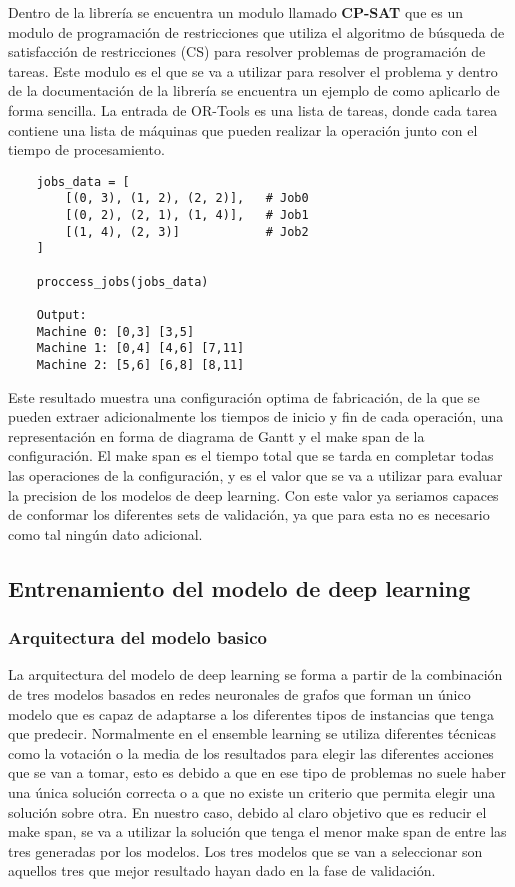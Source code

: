 Dentro de la librería se encuentra un modulo llamado \textbf{CP-SAT} que es un modulo de programación
de restricciones que utiliza el algoritmo de búsqueda de satisfacción de restricciones (CS) para resolver
problemas de programación de tareas. Este modulo es el que se va a utilizar para resolver el problema y
dentro de la documentación \cite{ortools-jobshop} de la librería se encuentra un ejemplo de como 
aplicarlo de forma sencilla. La entrada de OR-Tools es una lista de tareas, donde cada tarea contiene
una lista de máquinas que pueden realizar la operación junto con el tiempo de procesamiento.\medskip

\begin{lstlisting}
    jobs_data = [                   
        [(0, 3), (1, 2), (2, 2)],   # Job0
        [(0, 2), (2, 1), (1, 4)],   # Job1
        [(1, 4), (2, 3)]            # Job2
    ]
   
    proccess_jobs(jobs_data)

    Output:
    Machine 0: [0,3] [3,5]
    Machine 1: [0,4] [4,6] [7,11]
    Machine 2: [5,6] [6,8] [8,11]
\end{lstlisting}

Este resultado muestra una configuración optima de fabricación, de la que se pueden extraer
adicionalmente los tiempos de inicio y fin de cada operación, una representación en forma de
diagrama de Gantt y el make span de la configuración. El make span es el tiempo total que se 
tarda en completar todas las operaciones de la configuración, y es el valor que se va a utilizar
para evaluar la precision de los modelos de deep learning. Con este valor ya seriamos capaces
de conformar los diferentes sets de validación, ya que para esta no es necesario como tal ningún
dato adicional. 

\subsection{Entrenamiento del modelo de deep learning}
\subsubsection{Arquitectura del modelo basico}
La arquitectura del modelo de deep learning se forma a partir de la combinación de tres 
modelos basados en redes neuronales de grafos que forman un único modelo que es capaz 
de adaptarse a los diferentes tipos de instancias que tenga que predecir. Normalmente en el
ensemble learning se utiliza diferentes técnicas como la votación o la media de los resultados
para elegir las diferentes acciones que se van a tomar, esto es debido a que en ese tipo de problemas
no suele haber una única solución correcta o a que no existe un criterio que permita 
elegir una solución sobre otra. En nuestro caso, debido al claro objetivo que es reducir 
el make span, se va a utilizar la solución que tenga el menor make span de entre las tres 
generadas por los modelos. Los tres modelos que se van a seleccionar son aquellos tres 
que mejor resultado hayan dado en la fase de validación.\medskip

